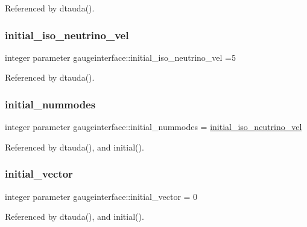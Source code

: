 Referenced by dtauda().

\mbox{\label{namespacegaugeinterface_a47175df2f7681cf8e8a2a7e2cb94952a}} 
\subsubsection{\texorpdfstring{initial\+\_\+iso\+\_\+neutrino\+\_\+vel}{initial\_iso\_neutrino\_vel}}
{\footnotesize\ttfamily integer parameter gaugeinterface\+::initial\+\_\+iso\+\_\+neutrino\+\_\+vel =5}



Referenced by dtauda().

\mbox{\label{namespacegaugeinterface_a4c1f07aacc342a123210732254937539}} 
\subsubsection{\texorpdfstring{initial\+\_\+nummodes}{initial\_nummodes}}
{\footnotesize\ttfamily integer parameter gaugeinterface\+::initial\+\_\+nummodes = \mbox{\hyperlink{namespacegaugeinterface_a47175df2f7681cf8e8a2a7e2cb94952a}{initial\+\_\+iso\+\_\+neutrino\+\_\+vel}}}



Referenced by dtauda(), and initial().

\mbox{\label{namespacegaugeinterface_a540c4e4d2e1dea17aeb55e137acb0218}} 
\subsubsection{\texorpdfstring{initial\+\_\+vector}{initial\_vector}}
{\footnotesize\ttfamily integer parameter gaugeinterface\+::initial\+\_\+vector = 0}



Referenced by dtauda(), and initial().


